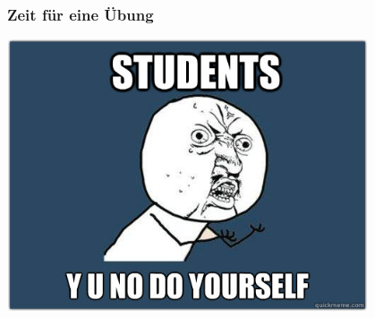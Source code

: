 \begin{frame}
	\frametitle{Zeit f\"ur eine \"Ubung}
	\center
	\includegraphics[width=0.8\textwidth,
	keepaspectratio=true]{bilder/uebung.png}
\end{frame}